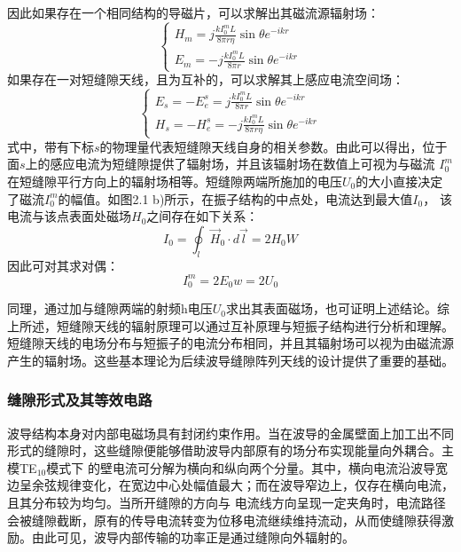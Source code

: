     因此如果存在一个相同结构的导磁片，可以求解出其磁流源辐射场：
\begin{equation}
    \begin{cases}
        H_m = j \frac{kI_0^m L}{8\pi r\eta} \sin \theta e^{-ikr}\\
        E_m = -j \frac{kI_0^m L}{8\pi r} \sin \theta e^{-ikr}
    \end{cases}
\end{equation}
    如果存在一对短缝隙天线，且为互补的，可以求解其上感应电流空间场：
\begin{equation}
    \begin{cases}
        E_s = -E_e^s = j \frac{kI_0^m L}{8\pi r} \sin \theta e^{-ikr} \\
        H_s = -H_e^s = -j \frac{kI_0^m L}{8\pi r\eta} \sin \theta e^{-ikr}
    \end{cases}
\end{equation}
    式中，带有下标$s$的物理量代表短缝隙天线自身的相关参数。由此可以得出，位于面$s$上的感应电流为短缝隙提供了辐射场，并且该辐射场在数值上可视为与磁流
    $I_0^m$在短缝隙平行方向上的辐射场相等。短缝隙两端所施加的电压$U_0$的大小直接决定了磁流$I_0^m$的幅值。如图2.1 b)所示，在振子结构的中点处，电流达到最大值$I_0$，
    该电流与该点表面处磁场$H_0$之间存在如下关系：
\begin{equation}
    I_0 = \oint_l \vec{H}_0 \cdot d\vec{l} = 2H_0 W
\end{equation}
因此可对其求对偶：
\begin{equation}
    I_0^m=2E_0 w=2U_0
\end{equation}

    同理，通过加与缝隙两端的射频h电压$U_0$求出其表面磁场，也可证明上述结论。综上所述，短缝隙天线的辐射原理可以通过互补原理与短振子结构进行分析和理解。
短缝隙天线的电场分布与短振子的电流分布相同，并且其辐射场可以视为由磁流源产生的辐射场。这些基本理论为后续波导缝隙阵列天线的设计提供了重要的基础。

\subsubsection{缝隙形式及其等效电路}

    波导结构本身对内部电磁场具有封闭约束作用。当在波导的金属壁面上加工出不同形式的缝隙时，这些缝隙便能够借助波导内部原有的场分布实现能量向外耦合。主模TE$_{10}$模式下
的壁电流可分解为横向和纵向两个分量。其中，横向电流沿波导宽边呈余弦规律变化，在宽边中心处幅值最大；而在波导窄边上，仅存在横向电流，且其分布较为均匀。当所开缝隙的方向与
电流线方向呈现一定夹角时，电流路径会被缝隙截断，原有的传导电流转变为位移电流继续维持流动，从而使缝隙获得激励。由此可见，波导内部传输的功率正是通过缝隙向外辐射的。
    
